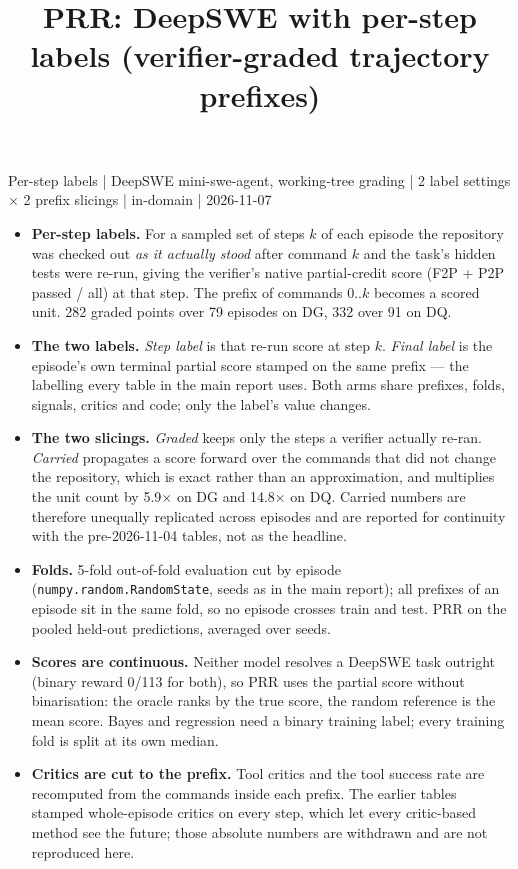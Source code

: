 \documentclass[10pt,a4paper]{article}
\author{}
\date{}
\title{PRR: DeepSWE with per-step labels (verifier-graded trajectory prefixes)}
\begin{document}
\maketitle
\vspace{-8mm}
{\small Per-step labels | DeepSWE mini-swe-agent, working-tree grading | 2 label settings \ensuremath{\times} 2 prefix slicings | in-domain | 2026-11-07\par}
\begin{itemize}\small
\item \textbf{Per-step labels.} For a sampled set of steps $k$ of each episode the repository was checked out \emph{as it actually stood} after command $k$ and the task's hidden tests were re-run, giving the verifier's native partial-credit score (F2P + P2P passed / all) at that step. The prefix of commands $0..k$ becomes a scored unit. 282 graded points over 79 episodes on DG, 332 over 91 on DQ.
\item \textbf{The two labels.} \emph{Step label} is that re-run score at step $k$. \emph{Final label} is the episode's own terminal partial score stamped on the same prefix --- the labelling every table in the main report uses. Both arms share prefixes, folds, signals, critics and code; only the label's value changes.
\item \textbf{The two slicings.} \emph{Graded} keeps only the steps a verifier actually re-ran. \emph{Carried} propagates a score forward over the commands that did not change the repository, which is exact rather than an approximation, and multiplies the unit count by 5.9\ensuremath{\times} on DG and 14.8\ensuremath{\times} on DQ. Carried numbers are therefore unequally replicated across episodes and are reported for continuity with the pre-2026-11-04 tables, not as the headline.
\item \textbf{Folds.} 5-fold out-of-fold evaluation cut by episode (\texttt{numpy.random.RandomState}, seeds as in the main report); all prefixes of an episode sit in the same fold, so no episode crosses train and test. PRR on the pooled held-out predictions, averaged over seeds.
\item \textbf{Scores are continuous.} Neither model resolves a DeepSWE task outright (binary reward 0/113 for both), so PRR uses the partial score without binarisation: the oracle ranks by the true score, the random reference is the mean score. Bayes and regression need a binary training label; every training fold is split at its own median.
\item \textbf{Critics are cut to the prefix.} Tool critics and the tool success rate are recomputed from the commands inside each prefix. The earlier tables stamped whole-episode critics on every step, which let every critic-based method see the future; those absolute numbers are withdrawn and are not reproduced here.

\end{itemize}
\end{document}
